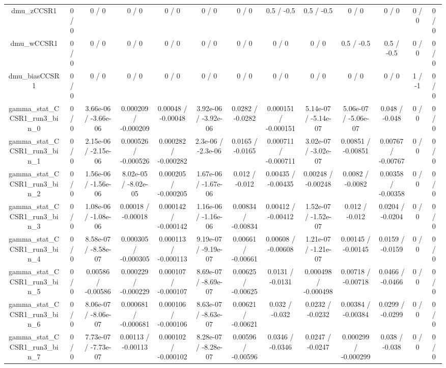 \documentclass[10pt]{article}
\begin{document}
\begin{table}[htbp]
\begin{center}
\begin{tabular}{|c|c|c|c|c|c|c|c|c|c|c|c|c|}
  dmu_zCCSR1 & 0 / 0 & 0 / 0 & 0 / 0 & 0 / 0 & 0 / 0 & 0 / 0 & 0.5 / -0.5 & 0.5 / -0.5 & 0 / 0 & 0 / 0 & 0 / 0 & 0 / 0 \\ 
  dmu_wCCSR1 & 0 / 0 & 0 / 0 & 0 / 0 & 0 / 0 & 0 / 0 & 0 / 0 & 0 / 0 & 0 / 0 & 0.5 / -0.5 & 0.5 / -0.5 & 0 / 0 & 0 / 0 \\ 
  dmu_biasCCSR1 & 0 / 0 & 0 / 0 & 0 / 0 & 0 / 0 & 0 / 0 & 0 / 0 & 0 / 0 & 0 / 0 & 0 / 0 & 0 / 0 & 1 / -1 & 0 / 0 \\ 
  gamma_stat_CCSR1_run3_bin_0 & 0 / 0 & 3.66e-06 / -3.66e-06 & 0.000209 / -0.000209 & 0.00048 / -0.00048 & 3.92e-06 / -3.92e-06 & 0.0282 / -0.0282 & 0.000151 / -0.000151 & 5.14e-07 / -5.14e-07 & 5.06e-07 / -5.06e-07 & 0.048 / -0.048 & 0 / 0 & 0 / 0 \\ 
  gamma_stat_CCSR1_run3_bin_1 & 0 / 0 & 2.15e-06 / -2.15e-06 & 0.000526 / -0.000526 & 0.000282 / -0.000282 & 2.3e-06 / -2.3e-06 & 0.0165 / -0.0165 & 0.000711 / -0.000711 & 3.02e-07 / -3.02e-07 & 0.00851 / -0.00851 & 0.00767 / -0.00767 & 0 / 0 & 0 / 0 \\ 
  gamma_stat_CCSR1_run3_bin_2 & 0 / 0 & 1.56e-06 / -1.56e-06 & 8.02e-05 / -8.02e-05 & 0.000205 / -0.000205 & 1.67e-06 / -1.67e-06 & 0.012 / -0.012 & 0.00435 / -0.00435 & 0.00248 / -0.00248 & 0.0082 / -0.0082 & 0.00358 / -0.00358 & 0 / 0 & 0 / 0 \\ 
  gamma_stat_CCSR1_run3_bin_3 & 0 / 0 & 1.08e-06 / -1.08e-06 & 0.00018 / -0.00018 & 0.000142 / -0.000142 & 1.16e-06 / -1.16e-06 & 0.00834 / -0.00834 & 0.00412 / -0.00412 & 1.52e-07 / -1.52e-07 & 0.012 / -0.012 & 0.0204 / -0.0204 & 0 / 0 & 0 / 0 \\ 
  gamma_stat_CCSR1_run3_bin_4 & 0 / 0 & 8.58e-07 / -8.58e-07 & 0.000305 / -0.000305 & 0.000113 / -0.000113 & 9.19e-07 / -9.19e-07 & 0.00661 / -0.00661 & 0.00608 / -0.00608 & 1.21e-07 / -1.21e-07 & 0.00145 / -0.00145 & 0.0159 / -0.0159 & 0 / 0 & 0 / 0 \\ 
  gamma_stat_CCSR1_run3_bin_5 & 0 / 0 & 0.00586 / -0.00586 & 0.000229 / -0.000229 & 0.000107 / -0.000107 & 8.69e-07 / -8.69e-07 & 0.00625 / -0.00625 & 0.0131 / -0.0131 & 0.000498 / -0.000498 & 0.00718 / -0.00718 & 0.0466 / -0.0466 & 0 / 0 & 0 / 0 \\ 
  gamma_stat_CCSR1_run3_bin_6 & 0 / 0 & 8.06e-07 / -8.06e-07 & 0.000681 / -0.000681 & 0.000106 / -0.000106 & 8.63e-07 / -8.63e-07 & 0.00621 / -0.00621 & 0.032 / -0.032 & 0.0232 / -0.0232 & 0.00384 / -0.00384 & 0.0299 / -0.0299 & 0 / 0 & 0 / 0 \\ 
  gamma_stat_CCSR1_run3_bin_7 & 0 / 0 & 7.73e-07 / -7.73e-07 & 0.00113 / -0.00113 & 0.000102 / -0.000102 & 8.28e-07 / -8.28e-07 & 0.00596 / -0.00596 & 0.0346 / -0.0346 & 0.0247 / -0.0247 & 0.000299 / -0.000299 & 0.038 / -0.038 & 0 / 0 & 0 / 0 \\ 

\end{tabular}
\end{center}
\end{table}
\end{document}
